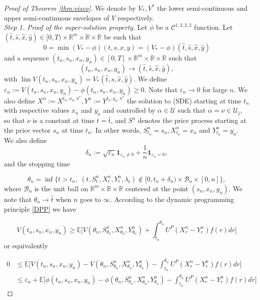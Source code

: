 \documentclass[11pt,a4paper]{article}
\theoremstyle{thmstyleone}%
\theoremstyle{thmstyletwo}%
\theoremstyle{thmstylethree}%
\newcommand{\E}{\mathbb{E}}
\begin{document}
\begin{proof}[Proof of Theorem \ref{thm:visco}] We denote by $V_*,V^*$ the lower semi-continuous and upper semi-continuous envelopes of $V$ respectively.\\


    \textit{Step 1. Proof of the super-solution property.} Let $\phi$ be a $\mathcal C^{1,2,2,2}$ function. Let $(\hat t,\hat s,\hat x,\hat y)\in [0,T)\times \mathbb R^m\times \mathbb R\times \mathbb R$ be such that 
    \[0=\min (V_*-\phi)(t,s,x,y)=(V_*-\phi)(\hat t,\hat s,\hat x,\hat y)\] and a sequence $(t_n,s_n,x_n,y_n)\in [0,T]\times \mathbb R^m\times \mathbb R\times \mathbb R$ such that 
    \[ (t_n,s_n,x_n,y_n)\longrightarrow  (\hat t,\hat s,\hat x,\hat y),\] with 
    $\lim\limits V(t_n,s_n,x_n,y_n) =V_*(\hat t,\hat s,\hat x,\hat y)$. We define $\varepsilon_n:= V(t_n,s_n,x_n,y_n)-\phi(t_n,s_n,x_n,y_n)\geq 0$. Note that $\varepsilon_n\longrightarrow 0$ for large $n$. We also define $X^n:=X^{t_n,x_n,\pi^*},Y^n:=Y^{t_n,y_n,\pi^*}$ the solution to (SDE) starting at time $t_n$ with respective values $x_n$ and $y_n$ and controlled by $\alpha\in \mathcal U$ such that $\alpha=\nu\in \mathcal U_{\hat t}$, so that $\nu$ is a constant at time $t=\hat t$, and $S^n$ denotes the price process starting at the price vector $s_n$ at time $t_n$. In other words, $S^n_{t_n}=s_n, X^n_{t_n}=x_n$ and $Y^n_{t_n}=y_n$. We also define 
    \[\delta_n:= \sqrt{\varepsilon_n}\mathbf 1_{\varepsilon_n\neq 0} + \frac1n \mathbf 1_{\varepsilon_n= 0},\]
and the stopping time

\[\theta_n=\inf\{t>t_n,\; (t,S^n_t,X^n_t,Y^n_t,\lambda_t)\notin [0,t_n+\delta_n)\times \mathcal B_n\times [0,n]\},\]
where $\mathcal B_n$ is the unit ball on $\mathbb R^m\times\mathbb R\times \mathbb R$ centered at the point $(s_n,x_n,y_n)$. We note that $\theta_n\longrightarrow \hat t$ when $n$ goes to $\infty$. According to the dynamic programming principle \eqref{DPP} we have 

\[ V(t_n,s_n,x_n,y_n)\geq  \E\bigl[ V(\theta_n, S_{\theta_n}^{n},X_{\theta_n}^{n},Y_{\theta_n}^{n}) + \int_{t_n}^{\theta_n}U^P(X_{r}^{n} - Y^{n}_r) f(r)dr \bigl]
\]
or equivalently


\begin{align*}
0&\leq  \E\bigl[V(t_n,s_n,x_n,y_n)- V(\theta_n, S_{\theta_n}^{n},X_{\theta_n}^{n},Y_{\theta_n}^{n}) - \int_{t_n}^{\theta_n}U^P(X_{r}^{n} - Y^{n}_r) f(r)dr \bigl]\\
&\leq \varepsilon_n+ \E\bigl[\phi(t_n,s_n,x_n,y_n)- \phi(\theta_n, S_{\theta_n}^{n},X_{\theta_n}^{n},Y_{\theta_n}^{n}) - \int_{t_n}^{\theta_n}U^P(X_{r}^{n} - Y^{n}_r) f(r)dr \bigl]
\end{align*}


\end{proof}
\end{document}
